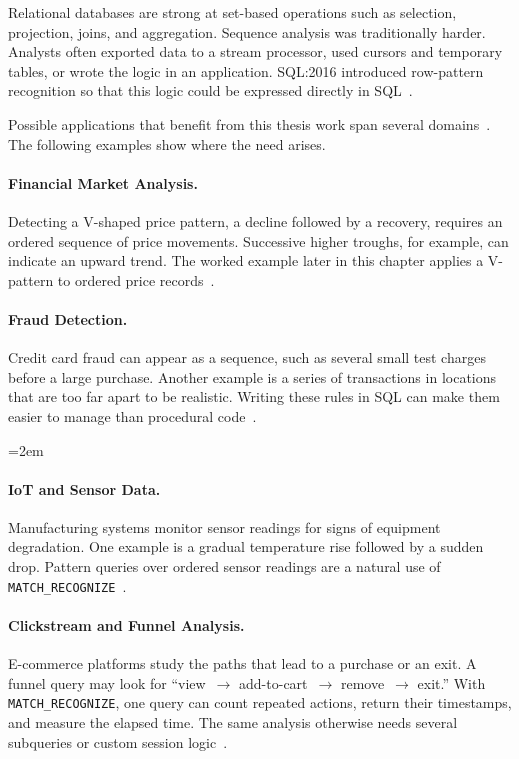 Relational databases are strong at set-based operations such as
selection, projection, joins, and aggregation.  Sequence analysis was
traditionally harder.  Analysts often exported data to a stream
processor, used cursors and temporary tables, or wrote the logic in an
application.  SQL:2016 introduced row-pattern recognition so that this
logic could be expressed directly in SQL~\cite{ISO2016SQL}.

Possible applications that benefit from this thesis work span several
domains~\cite{OracleMR}.  The following examples show where the need
arises.

\paragraph{Financial Market Analysis.}
Detecting a V-shaped price pattern, a decline followed by a recovery,
requires an ordered sequence of price movements.  Successive
higher troughs, for example, can indicate an upward trend.  The worked
example later in this chapter applies a V-pattern to ordered price
records~\cite{OracleMR}.

\paragraph{Fraud Detection.}
Credit card fraud can appear as a sequence, such as several small test
charges before a large purchase.  Another example is a series of
transactions in locations that are too far apart to be realistic.
Writing these rules in SQL can make them easier to manage than
procedural code~\cite{petkovic2022fraud}.

\begingroup\emergencystretch=2em
\paragraph{IoT and Sensor Data.}
Manufacturing systems monitor sensor readings for signs of equipment
degradation.  One example is a gradual temperature rise followed by a
sudden drop.  Pattern queries over ordered sensor readings are a
natural use of \texttt{MATCH\_RECOGNIZE}~\cite{OracleMR}.\par\endgroup

\paragraph{Clickstream and Funnel Analysis.}
E-commerce platforms study the paths that lead to a purchase or an
exit.  A funnel query may look for
``view~$\rightarrow$ add-to-cart~$\rightarrow$ remove~$\rightarrow$
exit.''  With \texttt{MATCH\_RECOGNIZE}, one query can count repeated
actions, return their timestamps, and measure the elapsed time.  The
same analysis otherwise needs several subqueries or custom session
logic~\cite{hoffa2021snowflake}.

